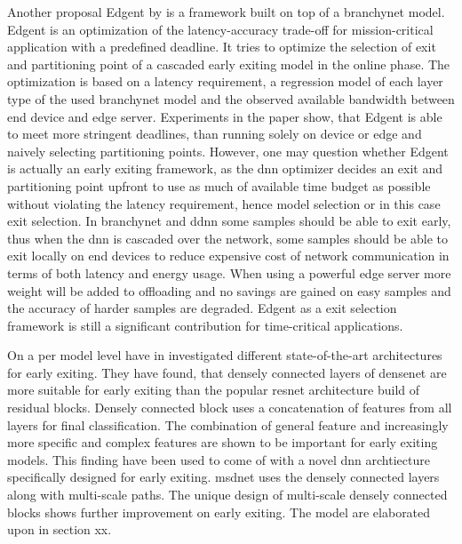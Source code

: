 Another proposal Edgent \cite{li_edge_2018} by \citeauthor{li_edge_2018} is a framework built on top of a \gls{branchynet} model. Edgent is an optimization of the latency-accuracy trade-off for mission-critical application with a predefined deadline. It tries to optimize the selection of exit and partitioning point of a cascaded early exiting model in the online phase. The optimization is based on a latency requirement, a regression model of each layer type of the used \gls{branchynet} model and the observed available bandwidth between end device and edge server. Experiments in the paper show, that Edgent is able to meet more stringent deadlines, than running solely on device or edge and naively selecting partitioning points. However, one may question whether Edgent is actually an early exiting framework, as the \gls{dnn} optimizer decides an exit and partitioning point upfront to use as much of available time budget as possible without violating the latency requirement, hence model selection or in this case exit selection. In \gls{branchynet} and \gls{ddnn} some samples should be able to exit early, thus when the \gls{dnn} is cascaded over the network, some samples should be able to exit locally on end devices to reduce expensive cost of network communication in terms of both latency and energy usage. When using a powerful edge server more weight will be added to offloading and no savings are gained on easy samples and the accuracy of harder samples are degraded. Edgent as a exit selection framework is still a significant contribution for time-critical applications.

On a per model level \citeauthor{huang_multi-scale_2017} have in \cite{huang_multi-scale_2017} investigated different state-of-the-art architectures for early exiting. They have found, that  densely connected layers of \gls{densenet} \cite{huang_densely_2016} are more suitable for early exiting than the popular \gls{resnet} architecture build of residual blocks. Densely connected block uses a concatenation of features from all layers for final classification. The combination of  general feature and increasingly more specific and complex features are shown to be important for early exiting models. This finding have been used to come of with a novel \gls{dnn} archtiecture specifically designed for early exiting. \gls{msdnet} \cite{huang_multi-scale_2017} uses the densely connected layers along with multi-scale paths. The unique design of multi-scale densely connected blocks shows further improvement on early exiting. The model are elaborated upon in section xx.


